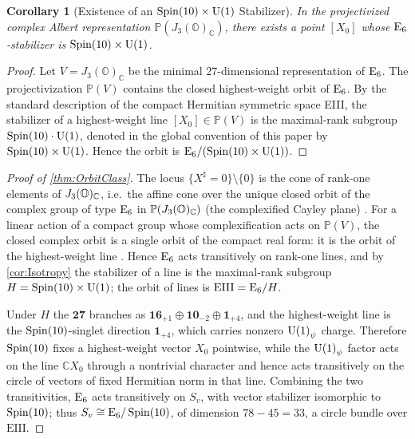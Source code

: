 \documentclass[pdflatex,sn-mathphys-num]{sn-jnl}
\theoremstyle{thmstyleone}
\newtheorem{corollary}[corollary]{Corollary}
\theoremstyle{thmstylethree}%
\theoremstyle{thmstyletwo}%
\begin{document}
\begin{corollary}[Existence of an $\operatorname{Spin}(10) \times \mathrm{U(1)}$ Stabilizer]
\label{cor:Isotropy}
In the projectivized complex Albert representation
\(\mathbb P(J_3(\mathbb O)_{\mathbb C})\), there exists a point
\([X_0]\) whose \(\mathrm{E}_{6}\)-stabilizer is \(\operatorname{Spin}(10) \times \mathrm{U(1)}\).
\end{corollary}

\begin{proof}
Let \(V=J_3(\mathbb O)_{\mathbb C}\) be the minimal \(27\)-dimensional
representation of \(\mathrm{E}_{6}\). The projectivization \(\mathbb P(V)\)
contains the closed highest-weight orbit of \(\mathrm{E}_{6}\). By the standard
description of the compact Hermitian symmetric space EIII, the stabilizer
of a highest-weight line \([X_0]\in\mathbb P(V)\) is the maximal-rank
subgroup \(\operatorname{Spin}(10)\cdot \mathrm{U(1)}\), denoted in the global convention of
this paper by \(\operatorname{Spin}(10) \times \mathrm{U(1)}\). Hence the orbit is
\(\mathrm{E}_{6}/(\operatorname{Spin}(10) \times \mathrm{U(1)})\).
\end{proof}

\begin{proof}[Proof of \autoref{thm:OrbitClass}]
The locus $\{X^{\sharp}=0\}\setminus\{0\}$ is the cone of rank-one elements of
$J_3(\mathbb{O})_{\mathbb C}$, i.e.\ the affine cone over the unique closed orbit of the complex
group of type $\mathrm{E}_6$ in $\mathbb P(J_3(\mathbb{O})_{\mathbb C})$ (the complexified Cayley plane)
\cite{Springer:2000}. For a linear action of a compact group whose
complexification acts on $\mathbb P(V)$, the closed complex orbit is a single
orbit of the compact real form: it is the orbit of the highest-weight line
\cite{Helgason:1978}. Hence $\mathrm{E}_{6}$ acts transitively on rank-one lines, and
by \autoref{cor:Isotropy} the stabilizer of a line is the maximal-rank
subgroup $H=\operatorname{Spin}(10) \times \mathrm{U(1)}$; the orbit of lines is
$\mathrm{EIII}=\mathrm{E}_{6}/H$.

Under $H$ the $\mathbf{27}$ branches as
$\mathbf{16}_{+1}\oplus\mathbf{10}_{-2}\oplus\mathbf{1}_{+4}$, and the
highest-weight line is the $\operatorname{Spin}(10)$-singlet direction $\mathbf{1}_{+4}$,
which carries nonzero $\mathrm{U(1)}_\psi$ charge. Therefore $\operatorname{Spin}(10)$ fixes a
highest-weight vector $X_{0}$ pointwise, while the $\mathrm{U(1)}_\psi$ factor acts on
the line $\mathbb C X_{0}$ through a nontrivial character and hence acts
transitively on the circle of vectors of fixed Hermitian norm in that line.
Combining the two transitivities, $\mathrm{E}_{6}$ acts transitively on $S_{v}$, with
vector stabilizer isomorphic to $\operatorname{Spin}(10)$; thus
$S_{v}\cong\mathrm{E}_{6}/\operatorname{Spin}(10)$, of dimension $78-45=33$, a circle bundle over
$\mathrm{EIII}$.
\end{proof}
\end{document}
